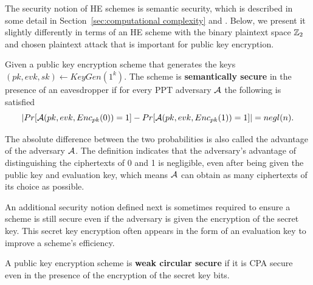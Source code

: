 \documentclass[../main.tex]{subfiles}
\begin{document}
The security notion of HE schemes is semantic security, which is described in some detail in Section~\ref{sec:computational complexity} and . %
Below, we present it slightly differently in terms of an HE scheme with the binary plaintext space $\mathbb{Z}_2$ and chosen plaintext attack that is important for public key encryption. 

\begin{definition}
\label{def:semSecCPA}
\reversemarginpar
{}
Given a public key encryption scheme that generates the keys $(pk, evk, sk) \leftarrow KeyGen(1^k)$. The scheme is \textbf{semantically secure} in the presence of an eavesdropper if for every PPT adversary $\mathcal{A}$ the following is satisfied 
\begin{equation*}
    \left|Pr[\mathcal{A}(pk, evk, Enc_{pk}(0))=1] - Pr[\mathcal{A}(pk, evk, Enc_{pk}(1))=1]\right| = negl(n).
\end{equation*}
\end{definition}

The absolute difference between the two probabilities is also called the advantage of the adversary $\mathcal{A}$. The definition indicates that the adversary's advantage of distinguishing the ciphertexts of 0 and 1 is negligible, even after being given the public key and evaluation key, which means $\mathcal{A}$ can obtain as many ciphertexts of its choice as possible. 


An additional security notion defined next is sometimes required to ensure a scheme is still secure even if the adversary is given the encryption of the secret key. This secret key encryption often appears in the form of an evaluation key to improve a scheme's efficiency. 
\begin{definition}
\label{def:weakCircularSec}
A public key encryption scheme is \textbf{weak circular secure} if it is CPA secure even in the presence of the encryption of the secret key bits.  
\end{definition}
\end{document}
